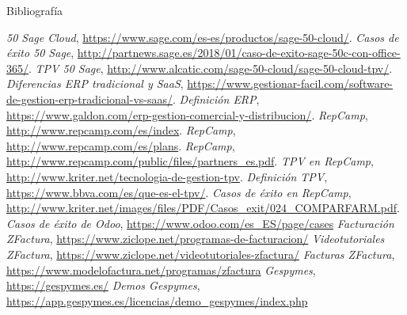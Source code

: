\documentclass{beamer}
\begin{document}
%
\begin{frame}{Bibliografía}
\begin{thebibliography}{9}

 \textit{50 Sage Cloud}, \url{https://www.sage.com/es-es/productos/sage-50-cloud/}.
 \textit{Casos de éxito 50 Sage}, \url{http://partnews.sage.es/2018/01/caso-de-exito-sage-50c-con-office-365/}.
 \textit{TPV 50 Sage}, \url{http://www.alcatic.com/sage-50-cloud/sage-50-cloud-tpv/}.
 \textit{Diferencias ERP tradicional y SaaS}, \url{https://www.gestionar-facil.com/software-de-gestion-erp-tradicional-vs-saas/}.
 \textit{Definición ERP}, \url{https://www.galdon.com/erp-gestion-comercial-y-distribucion/}.
 \textit{RepCamp}, \url{http://www.repcamp.com/es/index}.
 \textit{RepCamp}, \url{http://www.repcamp.com/es/plans}.
 \textit{RepCamp}, \url{http://www.repcamp.com/public/files/partners_es.pdf}.
 \textit{TPV en RepCamp}, \url{http://www.kriter.net/tecnologia-de-gestion-tpv}.
 \textit{Definición TPV}, \url{https://www.bbva.com/es/que-es-el-tpv/}.
 \textit{Casos de éxito en RepCamp}, \url{http://www.kriter.net/images/files/PDF/Casos_exit/024_COMPARFARM.pdf}.
 \textit{Casos de éxito de Odoo}, \url{https://www.odoo.com/es_ES/page/cases}
 \textit{Facturación ZFactura}, \url{https://www.ziclope.net/programas-de-facturacion/}
 \textit{Videotutoriales ZFactura}, \url{https://www.ziclope.net/videotutoriales-zfactura/}
 \textit{Facturas ZFactura}, \url{https://www.modelofactura.net/programas/zfactura}
 \textit{Gespymes}, \url{https://gespymes.es/}
 \textit{Demos Gespymes}, \url{https://app.gespymes.es/licencias/demo_gespymes/index.php}
\end{thebibliography}
\end{frame}

%
%
\end{document}
